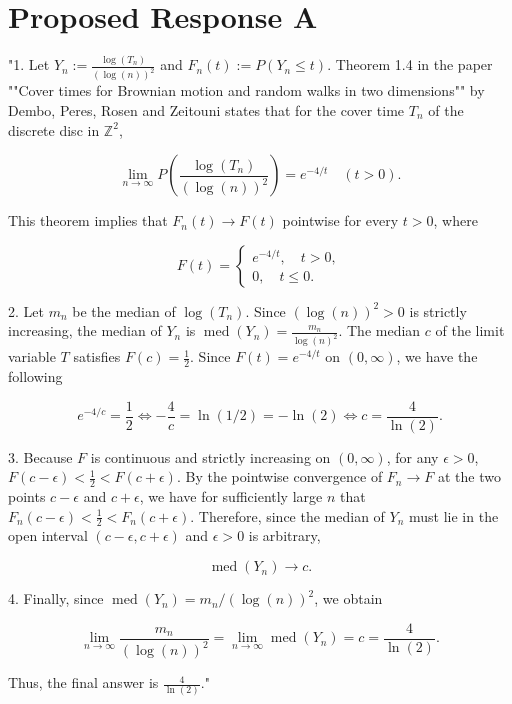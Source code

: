 \documentclass[11pt]{article}
\begin{document}
\section*{Proposed Response A}
"1. Let $Y_n := \frac{\log(T_n)}{(\log(n))^2}$ and $F_n(t) := P(Y_n \leq t)$. Theorem 1.4 in the paper ""Cover times for Brownian motion and random walks in two dimensions"" by Dembo, Peres, Rosen and Zeitouni states that for the cover time $T_n$ of the discrete disc in $\mathbb{Z}^2$, 

$$
\lim_{n \to \infty} P\left(\frac{\log(T_n)}{(\log(n))^2}\right) = e^{-4/t} \quad (t > 0).
$$

This theorem implies that $F_n(t) \to F(t)$ pointwise for every $t > 0$, where 

$$
F(t) = \begin{cases}
e^{-4/t}, \quad t > 0, \\ 
0, \quad t \leq 0.
\end{cases}
$$

2. Let $m_n$ be the median of $\log(T_n)$. Since $(\log(n))^2 > 0$ is strictly increasing, the median of $Y_n$ is $\operatorname{med}(Y_n) = \frac{m_n}{\log(n)^2}$. The median $c$ of the limit variable $T$ satisfies $F(c) = \frac{1}{2}$. Since $F(t) = e^{-4/t}$ on $(0, \infty)$, we have the following

$$
e^{-4/c} = \frac{1}{2} \iff -\frac{4}{c} = \ln(1/2) = - \ln(2) \iff c = \frac{4}{\ln(2)}.
$$

3. Because $F$ is continuous and strictly increasing on $(0, \infty)$, for any $\epsilon > 0$, $F(c - \epsilon) < \frac{1}{2} < F(c + \epsilon)$. By the pointwise convergence of $F_n \to F$ at the two points $c - \epsilon$ and $c + \epsilon$, we have for sufficiently large $n$ that $F_n(c - \epsilon) < \frac{1}{2} < F_n(c + \epsilon)$. Therefore, since the median of $Y_n$ must lie in the open interval $(c - \epsilon, c + \epsilon)$ and $\epsilon > 0$ is arbitrary, 

$$
\operatorname{med}(Y_n) \to c.
$$

4. Finally, since $\operatorname{med}(Y_n) = m_n/(\log(n))^2$, we obtain 

$$
\lim_{n \to \infty} \frac{m_n}{(\log(n))^2} = \lim_{n \to \infty} \operatorname{med}(Y_n) = c = \frac{4}{\ln(2)}.
$$

Thus, the final answer is $\frac{4}{\ln(2)}$."
\end{document}
